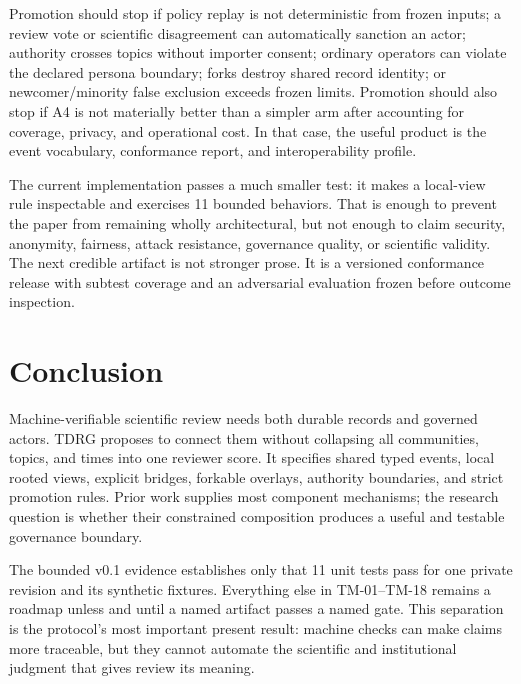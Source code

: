 \documentclass[11pt]{article}
\newcommand{\tdrg}{TDRG}
\begin{document}
Promotion should stop if policy replay is not deterministic from frozen inputs; a
review vote or scientific disagreement can automatically sanction an actor; authority
crosses topics without importer consent; ordinary operators can violate the declared
persona boundary; forks destroy shared record identity; or newcomer/minority false
exclusion exceeds frozen limits. Promotion should also stop if A4 is not materially
better than a simpler arm after accounting for coverage, privacy, and operational
cost. In that case, the useful product is the event vocabulary, conformance report,
and interoperability profile.

The current implementation passes a much smaller test: it makes a local-view rule
inspectable and exercises 11 bounded behaviors. That is enough to prevent the paper
from remaining wholly architectural, but not enough to claim security, anonymity,
fairness, attack resistance, governance quality, or scientific validity. The next
credible artifact is not stronger prose. It is a versioned conformance release with
subtest coverage and an adversarial evaluation frozen before outcome inspection.

\section{Conclusion}

Machine-verifiable scientific review needs both durable records and governed actors.
\tdrg{} proposes to connect them without collapsing all communities, topics, and
times into one reviewer score. It specifies shared typed events, local rooted views,
explicit bridges, forkable overlays, authority boundaries, and strict promotion
rules. Prior work supplies most component mechanisms; the research question is
whether their constrained composition produces a useful and testable governance
boundary.

The bounded v0.1 evidence establishes only that 11 unit tests pass for one private
revision and its synthetic fixtures. Everything else in TM-01--TM-18 remains a
roadmap unless and until a named artifact passes a named gate. This separation is
the protocol's most important present result: machine checks can make claims more
traceable, but they cannot automate the scientific and institutional judgment that
gives review its meaning.



\end{document}
